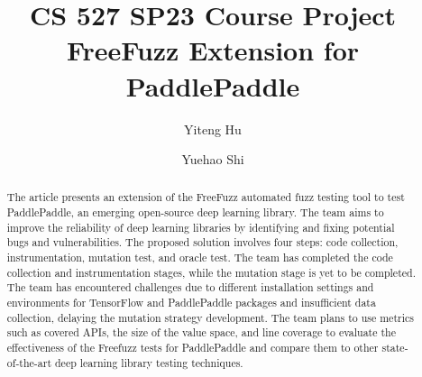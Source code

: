 \documentclass[sigconf]{acmart}
\begin{document}
\title{CS 527 SP23 Course Project \\ FreeFuzz Extension for PaddlePaddle}
\author{Yiteng Hu}
\author{Yuehao Shi}
\authornotemark[1]

\renewcommand{\shortauthors}{Hu and Shi, et al.}

\begin{abstract}
  The article presents an extension of the FreeFuzz automated fuzz testing tool to test PaddlePaddle, 
  an emerging open-source deep learning library. The team aims to improve the reliability of deep learning 
  libraries by identifying and fixing potential bugs and vulnerabilities. The proposed solution involves 
  four steps: code collection, instrumentation, mutation test, and oracle test. The team has completed 
  the code collection and instrumentation stages, while the mutation stage is yet to be completed. 
  The team has encountered challenges due to different installation settings and environments for
   TensorFlow and PaddlePaddle packages and insufficient data collection, delaying the mutation strategy development.
    The team plans to use metrics such as covered APIs, the size of the value space, and line coverage to evaluate the effectiveness 
    of the Freefuzz tests for PaddlePaddle and compare them to other state-of-the-art deep learning library testing techniques.
\end{abstract}

\end{document}
